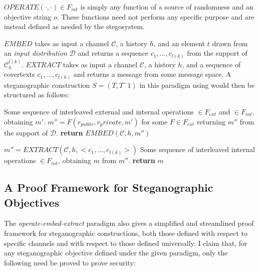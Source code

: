 \documentclass{article}
\begin{document}
$OPERATE(\cdot,\cdot) \in F_{int}$ is simply any function of a source of randomness and an objective string $o$.  These functions need not 
perform any specific purpose and are instead defined as needed by the stegosystem.

$EMBED$ takes as input a channel $\mathcal{C}$, a history $h$, and an element $t$ drawn from an \textit{input distribution} $\mathcal{D}$ and returns a sequence
$c_1,...,c_{l(k)}$ from the support of $\mathcal{C}_h^{l(k)}$.  $EXTRACT$ takes as input a channel $\mathcal{C}$, a history $h$, and 
a sequence of covertexts $c_1,...,c_{l(k)}$ and returns a message from some message space.
\newline\newline
A steganographic construction $S=(T,T^-1)$ in this paradigm using would then be structured as follows: 

\begin{algorithm}[H]
\begin{algorithmic}[1]
\State Some sequence of interleaved external and internal operations $\in F_{ext}$ and $\in F_{int}$, obtaining $m'$.
\State $m'' = F(r_{public}, r_private, m')$ for some $F \in F_{ext}$ returning $m''$ from the support of $\mathcal{D}$.
\State \textbf{return} $EMBED(\mathcal{C},h,m'')$
\EndProcedure
\end{algorithmic}
\end{algorithm}

\begin{algorithm}[H]
\begin{algorithmic}[1]
\State $m'' = EXTRACT(\mathcal{C},h,<c_1,...,c_{l(k)}>)$
\State Some sequence of interleaved internal operations $\in F_{int}$, obtaining $m$ from $m''$.
\State \textbf{return} $m$
\EndProcedure
\end{algorithmic}
\end{algorithm}

\subsection{A Proof Framework for Steganographic Objectives}

The \textit{operate-embed-extract} paradigm also gives a simplified and streamlined proof framework for steganographic 
constructions, both those defined with respect to specific channels and with respect to those defined universally.
\newline\newline
I claim that, for any steganographic objective defined under the given paradigm, only the following need be proved to prove 
security:
\end{document}
